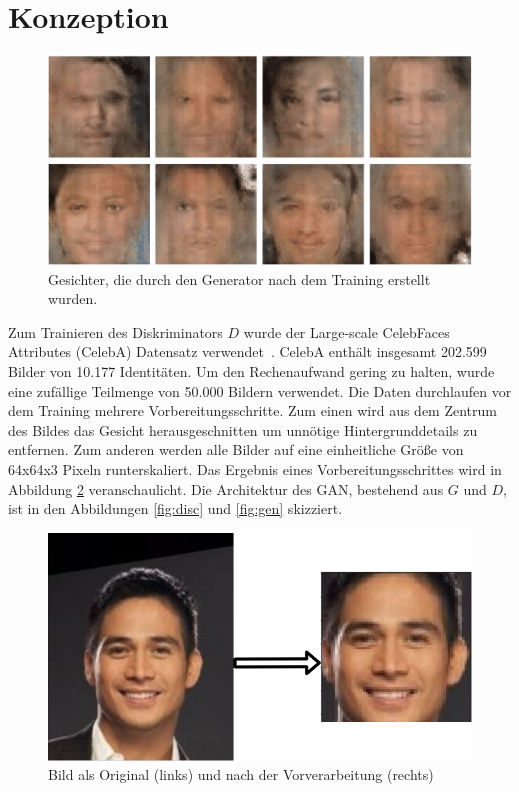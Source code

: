 \documentclass[twocolumn,10pt]{asme2ej}
\begin{document}
\section{Konzeption}\label{sec:2}

\begin{figure}
	\includegraphics[scale=0.35	]{result.png}
	\caption[center]{Gesichter, die durch den Generator nach dem Training erstellt wurden.}
	\label{fig:result}
\end{figure}

Zum Trainieren des Diskriminators $D$ wurde der Large-scale CelebFaces Attributes (CelebA) Datensatz verwendet \cite{liu2015faceattributes}. CelebA enthält insgesamt 202.599 Bilder von 10.177 Identitäten. Um den Rechenaufwand gering zu halten, wurde eine zufällige Teilmenge von 50.000 Bildern verwendet. Die Daten durchlaufen vor dem Training mehrere Vorbereitungsschritte. Zum einen wird aus dem Zentrum des Bildes das Gesicht herausgeschnitten um unnötige Hintergrunddetails zu entfernen. Zum anderen werden alle Bilder auf eine einheitliche Größe von 64x64x3 Pixeln runterskaliert. Das Ergebnis eines Vorbereitungsschrittes wird in Abbildung \ref{fig:preprocessing} veranschaulicht. Die Architektur des GAN, bestehend aus $G$ und $D$, ist in den Abbildungen \ref{fig:disc} und \ref{fig:gen} skizziert. 

\begin{figure}[h]
	\centering
	\captionsetup{justification=centering}
	\includegraphics[scale=0.2]{preprocessing.png}
	\caption[center]{Bild als Original (links) und nach der Vorverarbeitung (rechts)}
	\label{fig:preprocessing}
\end{figure}
\newpage
\end{document}
